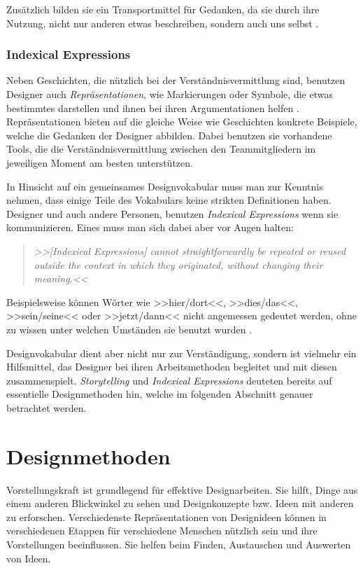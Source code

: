 \medskip Zusätzlich bilden sie ein Transportmittel für Gedanken, da sie durch ihre Nutzung, nicht nur anderen etwas beschreiben, sondern auch uns selbst \citep{Norman:1993}.

\subsubsection{Indexical Expressions}
Neben Geschichten, die nützlich bei der Verständnisvermittlung sind, benutzen Designer auch \emph{Repräsentationen}, wie Markierungen oder Symbole, die etwas bestimmtes darstellen und ihnen bei ihren Argumentationen helfen \citep{Norman:1993}. Repräsentationen bieten auf die gleiche Weise wie Geschichten konkrete Beispiele, welche die Gedanken der Designer abbilden. Dabei benutzen sie vorhandene Tools, die die Verständnisvermittlung zwischen den Teammitgliedern im jeweiligen Moment am besten unterstützen.

\medskip In Hinsicht auf ein gemeinsames Designvokabular muss man zur Kenntnis nehmen, dass einige Teile des Vokabulars keine strikten Definitionen haben. Designer und auch andere Personen, benutzen \emph{Indexical Expressions} wenn sie kommunizieren. Eines muss man sich dabei aber vor Augen halten:

\begin{quote}
	\textsl{>>[Indexical Expressions] cannot straightforwardly be repeated or reused outside the context in which they originated, without changing their meaning.<<}
\begin{flushright}\citep{Kristoffersen:1999}\end{flushright}
\end{quote}

Beispielsweise  können Wörter wie >>hier/dort<<, >>dies/das<<, >>sein/seine<< oder >>jetzt/dann<< nicht angemessen gedeutet werden, ohne zu wissen unter welchen Umständen sie benutzt wurden \citep{Larsson:2003}.

\medskip Designvokabular dient aber nicht nur zur Verständigung, sondern ist vielmehr ein Hilfsmittel, das Designer bei ihren Arbeitsmethoden begleitet und mit diesen zusammenspielt. \emph{Storytelling} und \emph{Indexical Expressions} deuteten bereits auf essentielle Designmethoden hin, welche im folgenden Abschnitt genauer betrachtet werden.

\section{Designmethoden} \label{sec:designmethoden}
Vorstellungskraft ist grundlegend für effektive Designarbeiten. Sie hilft, Dinge aus einem anderen Blickwinkel zu sehen und Designkonzepte bzw. Ideen mit anderen zu erforschen. Verschiedenste Repräsentationen von Designideen können in verschiedenen Etappen für verschiedene Menschen nützlich sein und ihre Vorstellungen beeinflussen. Sie helfen beim Finden, Austauschen und Auswerten von Ideen.

